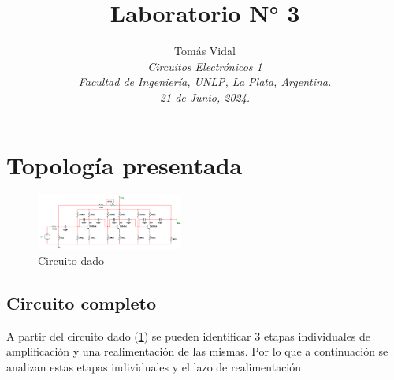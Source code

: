 \documentclass[letterpaper, 10 pt, conference]{ieeeconf}  %
\title{\LARGE \bf Laboratorio N° 3}
\author{
  Tom\'as Vidal\\
  {\it Circuitos Electrónicos 1}\\
  {\it Facultad de Ingenier\'ia, UNLP, La Plata, Argentina.}\\
  {\it 21 de Junio, 2024.}
}                                            %
\begin{document}
\maketitle
\thispagestyle{empty}
\pagestyle{empty}


\section{Topología presentada}
\begin{figure}[H]
 \centering
 \includegraphics[width=0.43\textwidth]{./Imagenes/circuito_completo.png}
 \caption{Circuito dado}
 \label{pic:circuito_completo}
\end{figure}
\subsection{Circuito completo}
A partir del circuito dado (\ref{pic:circuito_completo}) se pueden identificar 3 etapas individuales de amplificación y una realimentación de las mismas. Por lo que a continuación se analizan estas etapas individuales y el lazo de realimentación
\end{document}
